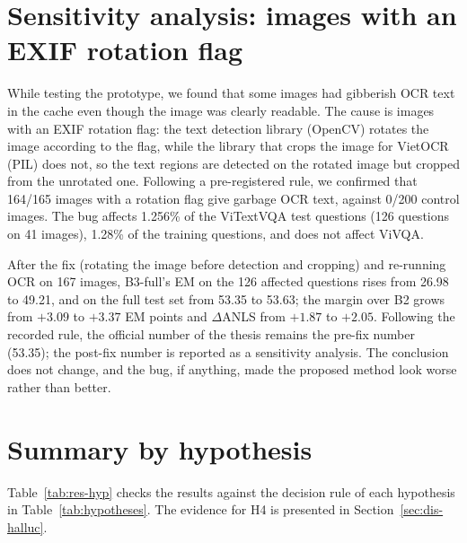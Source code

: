 \section{Sensitivity analysis: images with an EXIF rotation flag}
\label{sec:res-exif}

While testing the prototype, we found that some images had gibberish OCR text in the
cache even though the image was clearly readable. The cause is images with an EXIF rotation
flag: the text detection library (OpenCV) rotates the image according to the flag, while
the library that crops the image for VietOCR (PIL) does not, so the text regions are
detected on the rotated image but cropped from the unrotated one. Following a
pre-registered rule, we confirmed that 164/165 images with a rotation flag give
garbage OCR text, against 0/200 control images. The bug affects 1.256\% of the ViTextVQA
test questions (126 questions on 41 images), 1.28\% of the training questions, and does not
affect ViVQA.

After the fix (rotating the image before detection and cropping) and re-running OCR on 167
images, B3-full's EM on the 126 affected questions rises from 26.98 to 49.21, and on the
full test set from 53.35 to 53.63; the margin over B2 grows from $+3.09$ to $+3.37$ EM points
and $\Delta$ANLS from $+1.87$ to $+2.05$. Following the recorded rule, the official number of
the thesis remains the pre-fix number (53.35); the post-fix number is reported as a
sensitivity analysis. The conclusion does not change, and the bug, if anything, made the
proposed method look worse rather than better.

\section{Summary by hypothesis}
\label{sec:res-hyp}

Table~\ref{tab:res-hyp} checks the results against the decision rule of each hypothesis in
Table~\ref{tab:hypotheses}. The evidence for H4 is presented in Section~\ref{sec:dis-halluc}.

